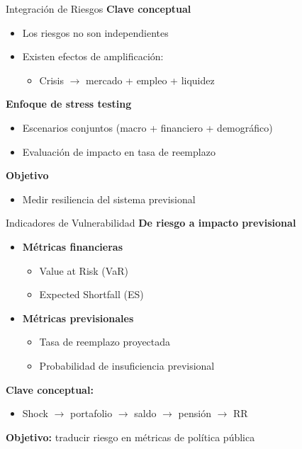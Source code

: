 \documentclass{beamer}
\begin{document}
\begin{frame}{Integración de Riesgos}
\textbf{Clave conceptual}

\begin{itemize}
\item Los riesgos no son independientes
\item Existen efectos de amplificación:
\begin{itemize}
\item Crisis $\rightarrow$ mercado + empleo + liquidez
\end{itemize}
\end{itemize}

\vspace{0.3cm}
\textbf{Enfoque de stress testing}
\begin{itemize}
\item Escenarios conjuntos (macro + financiero + demográfico)
\item Evaluación de impacto en tasa de reemplazo
\end{itemize}

\vspace{0.3cm}
\textbf{Objetivo}
\begin{itemize}
\item Medir resiliencia del sistema previsional
\end{itemize}
\end{frame}


\begin{frame}{Indicadores de Vulnerabilidad}
\textbf{De riesgo a impacto previsional}

\begin{itemize}
\item \textbf{Métricas financieras}
\begin{itemize}
\item Value at Risk (VaR)
\item Expected Shortfall (ES)
\end{itemize}

\vspace{0.2cm}

\item \textbf{Métricas previsionales}
\begin{itemize}
\item Tasa de reemplazo proyectada
\item Probabilidad de insuficiencia previsional
\end{itemize}
\end{itemize}

\vspace{0.3cm}

\textbf{Clave conceptual:}
\begin{itemize}
\item Shock $\rightarrow$ portafolio $\rightarrow$ saldo $\rightarrow$ pensión $\rightarrow$ RR
\end{itemize}

\vspace{0.3cm}

\textbf{Objetivo:} traducir riesgo en métricas de política pública
\end{frame}
\end{document}
